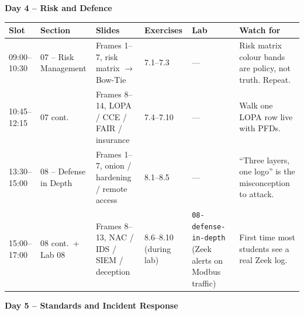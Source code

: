 \documentclass[10pt,a4paper,landscape]{article}
\newcommand{\sectionheader}[1]{%
  \noindent\colorbox{slideBlue}{\parbox{\dimexpr\textwidth-2\fboxsep}{%
    \color{white}\textbf{#1}}}\vspace{1mm}\par%
}
\begin{document}
\vspace{4mm}

\sectionheader{Day 4 -- Risk and Defence}

\begin{tabular}{|p{2.2cm}|p{4.0cm}|p{4.2cm}|p{4.0cm}|p{4.8cm}|p{4.0cm}|}
\hline
\rowcolor{slidePanel}
\textbf{Slot} & \textbf{Section} & \textbf{Slides} & \textbf{Exercises} & \textbf{Lab} & \textbf{Watch for} \\
\hline
09:00--10:30 & 07 -- Risk Management & Frames 1--7, risk matrix $\to$ Bow-Tie & 7.1--7.3 & --- & Risk matrix colour bands are policy, not truth. Repeat. \\
\hline
10:45--12:15 & 07 cont. & Frames 8--14, LOPA / CCE / FAIR / insurance & 7.4--7.10 & --- & Walk one LOPA row live with PFDs. \\
\hline
13:30--15:00 & 08 -- Defense in Depth & Frames 1--7, onion / hardening / remote access & 8.1--8.5 & --- & ``Three layers, one logo'' is the misconception to attack. \\
\hline
15:00--17:00 & 08 cont.\ + Lab 08 & Frames 8--13, NAC / IDS / SIEM / deception & 8.6--8.10 (during lab) & \texttt{08-defense-in-depth} (Zeek alerts on Modbus traffic) & First time most students see a real Zeek log. \\
\hline
\end{tabular}

\vspace{4mm}

\sectionheader{Day 5 -- Standards and Incident Response}
\end{document}
